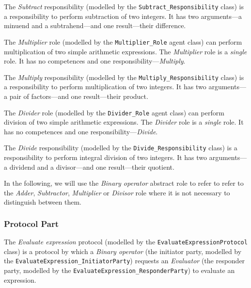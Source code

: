 The \textit{Subtract} responsibility (modelled by the \texttt{Subtract\_Responsibility} class) is a responsibility to perform subtraction of two integers.
It has two arguments---a minuend and a subtrahend---and one result---their difference.

The \textit{Multiplier} role (modelled by the \texttt{Multiplier\_Role} agent class) can perform multiplication of two simple arithmetic expressions.
The \textit{Multiplier} role is a \textit{single} role.
It has no competences and one responsibility---\textit{Multiply}.

The \textit{Multiply} responsibility (modelled by the \texttt{Multiply\_Responsibility} class) is a responsibility to perform multiplication of two integers.
It has two arguments---a pair of factors---and one result---their product.

The \textit{Divider} role (modelled by the \texttt{Divider\_Role} agent class) can perform division of two simple arithmetic expressions.
The \textit{Divider} role is a \textit{single} role.
It has no competences and one responsibility---\textit{Divide}. 

The \textit{Divide} responsibility (modelled by the \texttt{Divide\_Responsibility} class) is a responsibility to perform integral division of two integers.
It has two arguments---a dividend and a divisor---and one result---their quotient.

In the following, we will use the \textit{Binary operator} abstract role to refer to refer to the \textit{Adder}, \textit{Subtractor}, \textit{Multiplier} or \textit{Divisor} role where it is not necessary to distinguish between them.

\subsubsection*{Protocol Part}

The \textit{Evaluate expression} protocol (modelled by the \texttt{EvaluateExpressionProtocol} class) is a protocol by which a \textit{Binary operator} (the initiator party, modelled by the \texttt{EvaluateExpression\_InitiatorParty}) requests an \textit{Evaluator} (the responder party, modelled by the \texttt{EvaluateExpression\_ResponderParty}) to evaluate an expression.

